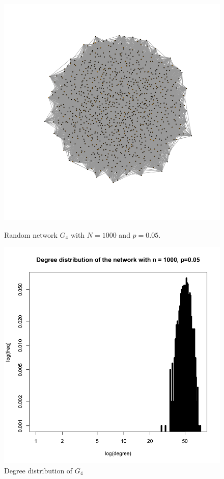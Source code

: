 \documentclass[draftcls,12pt,onecolumn]{IEEEtran}
\begin{document}
\begin{figure}[H]
\centering
\begin{minipage}[t]{0.48\textwidth}
\centering
\includegraphics[scale=0.2]{figures_part1_1/output_6_0.png}
\caption{Random network $G_4$ with $N=1000$ and $p=0.05$.}
\label{fig7}
\end{minipage}
\begin{minipage}[t]{0.48\textwidth}
\centering
\includegraphics[scale=0.2]{figures_part1_1/output_11_1.png}
\caption{Degree distribution of $G_4$}
\label{fig8}
\end{minipage}
\end{figure}
\end{document}
